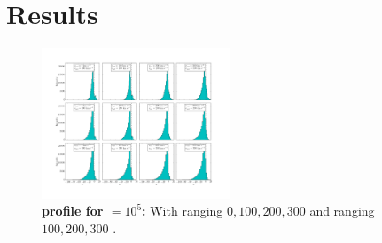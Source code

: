 \documentclass{latex/emulateapj}
\begin{document}






\section{Results}

\begin{figure}[h!]
\begin{center}
  \includegraphics[width=0.5\textwidth]{./figures/tau10E5.png}
\end{center}
\caption{\textbf{\lya profile for \tauh$=10^5$:} With \vrot ranging $0,100,200,300$ \kms and \vout ranging $100,200,300$ \kms.
\label{fig:tau10E5}}
\end{figure}
\end{document}
